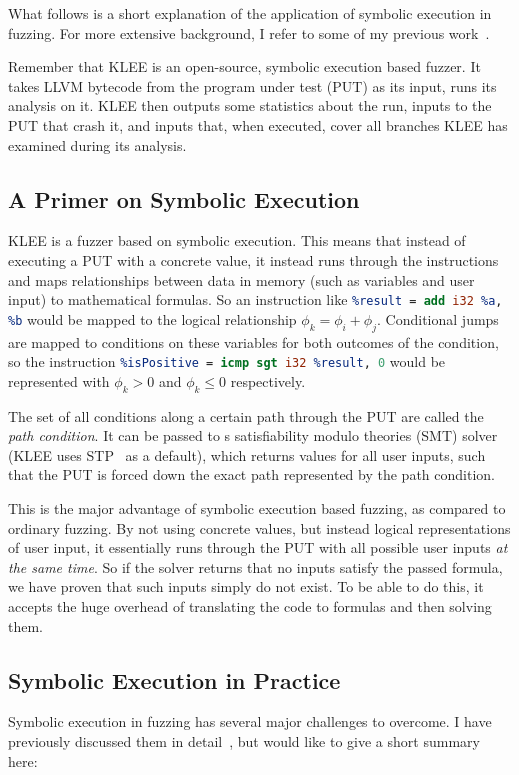 \documentclass{article}
\let\savedCite=\cite
\renewcommand{\cite}{\unskip~\savedCite}
\begin{document}
What follows is a short explanation of the application of symbolic execution in fuzzing. For more extensive background, I refer to some of my previous work\cite{EVA, BA}.

Remember that KLEE is an open-source, symbolic execution based fuzzer. It takes LLVM bytecode from the program under test (PUT) as its input, runs its analysis on it. KLEE then outputs some statistics about the run, inputs to the PUT that crash it, and inputs that, when executed, cover all branches KLEE has examined during its analysis.

\subsection{A Primer on Symbolic Execution}
KLEE is a fuzzer based on symbolic execution. This means that instead of executing a PUT with a concrete value, it instead runs through the instructions and maps relationships between data in memory (such as variables and user input) to mathematical formulas. So an instruction like \lstinline[language=llvm]{%result = add i32 %a, %b} would be mapped to the logical relationship $\phi_k=\phi_i+\phi_j$. Conditional jumps are mapped to conditions on these variables for both outcomes of the condition, so the instruction \lstinline[language=llvm]{%isPositive = icmp sgt i32 %result, 0} would be represented with $\phi_k>0$ and $\phi_k\le0$ respectively.

The set of all conditions along a certain path through the PUT are called the \textit{path condition}. It can be passed to s satisfiability modulo theories (SMT) solver (KLEE uses STP\cite{STP} as a default), which returns values for all user inputs, such that the PUT is forced down the exact path represented by the path condition.

This is the major advantage of symbolic execution based fuzzing, as compared to ordinary fuzzing. By not using concrete values, but instead logical representations of user input, it essentially runs through the PUT with all possible user inputs \textit{at the same time}. So if the solver returns that no inputs satisfy the passed formula, we have proven that such inputs simply do not exist. To be able to do this, it accepts the huge overhead of translating the code to formulas and then solving them.

\subsection{Symbolic Execution in Practice}
\label{SymbexPractice}
Symbolic execution in fuzzing has several major challenges to overcome. I have previously discussed them in detail\cite{EVA}, but would like to give a short summary here:
\end{document}
